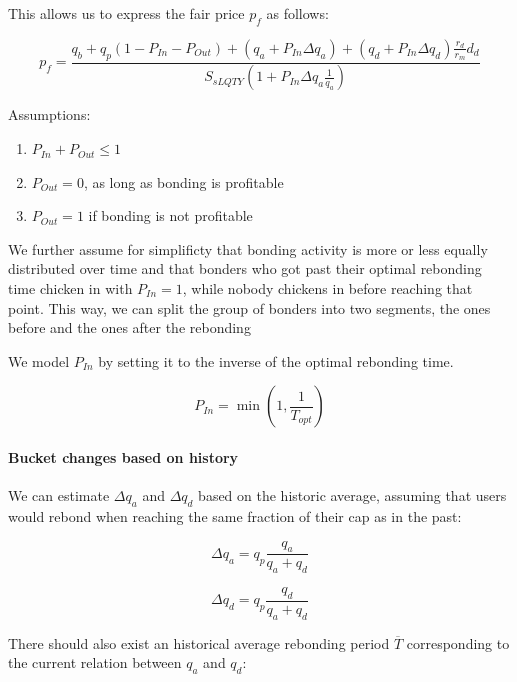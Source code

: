 \documentclass{article}
\begin{document}
This allows us to express the fair price $p_f$ as follows:

\begin{equation}
  \label{eq:recursive}
    p_{f} = \frac{q_{b}+q_{p}(1-P_{In}-P_{Out})+(q_{a}+ P_{In}\Delta q_{a})+(q_{d} + P_{In}\Delta q_{d})\frac{r_{d}}{r_{m}}d_{d}}{S_{sLQTY} \left( 1+P_{In} \Delta q_{a} \frac{1}{q_{a}} \right)}
\end{equation}

Assumptions:

\begin{enumerate}
	\item $P_{In} + P_{Out} \leq 1$
	\item $P_{Out} = 0$, as long as bonding is profitable
	\item $P_{Out} = 1$ if bonding is not profitable
\end{enumerate}

We further assume for simplificty that bonding activity is more or less equally distributed over time and that bonders who got past their optimal rebonding time chicken in with $P_{In}=1$, while nobody chickens in before reaching that point.
This way, we can split the group of bonders into two segments, the ones before and the ones after the rebonding

We model $P_{In}$ by setting it to the inverse of the optimal rebonding time.

\begin{equation}
    P_{In} = \min \left(1,\frac{1}{T_{opt}}\right)
\end{equation} 

\paragraph{Bucket changes based on history}
We can estimate $\Delta q_{a}$ and $\Delta q_{d}$ based on the historic average, assuming that users would rebond when reaching the same fraction of their cap as in the past:

\begin{equation}
\Delta q_{a} = q_{p} \frac{q_{a}}{q_{a}+q_{d}}
\end{equation}

\begin{equation}
\Delta q_{d} = q_{p} \frac{q_{d}}{q_{a}+q_{d}}
\end{equation}

There should also exist an historical average rebonding period $\overline{T}$ corresponding to the current relation between $q_a$ and $q_d$:
\end{document}

